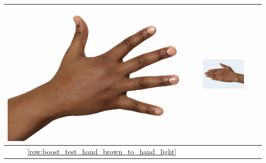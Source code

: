 \documentclass[12pt, a4paper]{article}
\begin{document}
\begin{longtable}{|c||c|c|c|}
\begin{minipage}{.29\textwidth}
    \includegraphics[width=\textwidth,height=\textheight,keepaspectratio]{../inputs/hand_dark.jpg}
  \end{minipage} & 
  \begin{minipage}{.29\textwidth}
    \includegraphics[width=\textwidth,height=\textheight,keepaspectratio]{../rc_test/outputs/20170516_boost_test/hand_brown_to_hand_dark.jpg}
  \end{minipage} \\
\hline  \ref{row:boost_test_hand_brown_to_hand_light} &
  \begin{minipage}{.29\textwidth}

\end{minipage}
\end{longtable}
\end{document}
